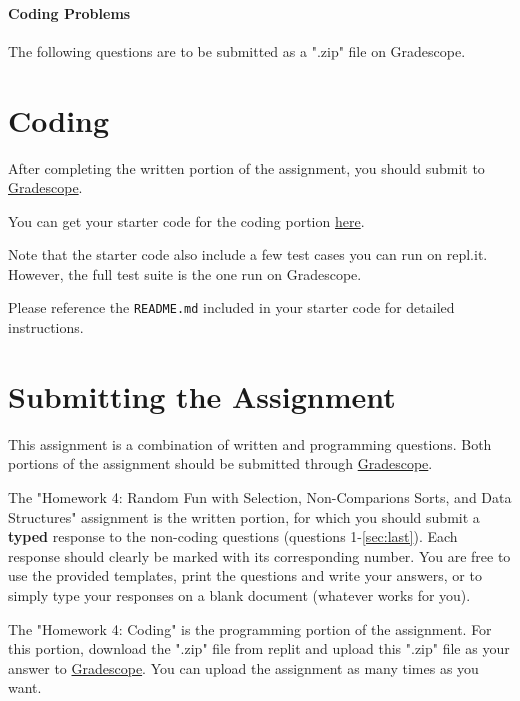 \documentclass [12pt]{article}
\begin{document}
\pagebreak
\begin{Instruction}

\paragraph{Coding Problems} The following questions are to be submitted as a ".zip" file on Gradescope. 

\end{Instruction}

\section{Coding }
 After completing the written portion of the assignment, you should submit to \href{https://www.gradescope.com/courses/350304}{Gradescope}.

You can get your starter code for the coding portion \href{https://replit.com/team/COMP285/HW4-Code}{here}.

Note that the starter code also include a few test cases you can run on repl.it. However, the full test suite is the one run on Gradescope.

Please reference the \texttt{README.md} included in your starter code for detailed instructions.

\section*{Submitting the Assignment}

This assignment is a combination of written and programming questions. Both portions of the assignment should be submitted through \href{https://www.gradescope.com/courses/350304}{Gradescope}.

The "Homework 4: Random Fun with Selection, Non-Comparions Sorts, and Data Structures" assignment is the written portion, for which you should submit a \textbf{typed} response to the non-coding questions (questions 1-\ref{sec:last}). Each response should clearly be marked with its corresponding number. You are free to use the provided templates, print the questions and write your answers, or to simply type your responses on a blank document (whatever works for you).

The "Homework 4: Coding" is the programming portion of the assignment. For this portion, download the ".zip" file from replit and upload this ".zip" file as your answer to \href{https://www.gradescope.com/courses/350304}{Gradescope}. You can upload the assignment as many times as you want.
\end{document}
